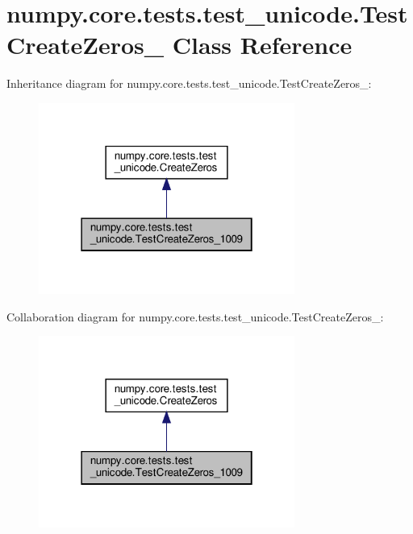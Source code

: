 \hypertarget{classnumpy_1_1core_1_1tests_1_1test__unicode_1_1TestCreateZeros__1009}{}\section{numpy.\+core.\+tests.\+test\+\_\+unicode.\+Test\+Create\+Zeros\+\_ Class Reference}
\label{classnumpy_1_1core_1_1tests_1_1test__unicode_1_1TestCreateZeros__1009}


Inheritance diagram for numpy.\+core.\+tests.\+test\+\_\+unicode.\+Test\+Create\+Zeros\+\_\+:
\nopagebreak
\begin{figure}[H]
\begin{center}
\leavevmode
\includegraphics[width=238pt]{classnumpy_1_1core_1_1tests_1_1test__unicode_1_1TestCreateZeros__1009__inherit__graph}
\end{center}
\end{figure}


Collaboration diagram for numpy.\+core.\+tests.\+test\+\_\+unicode.\+Test\+Create\+Zeros\+\_\+:
\nopagebreak
\begin{figure}[H]
\begin{center}
\leavevmode
\includegraphics[width=238pt]{classnumpy_1_1core_1_1tests_1_1test__unicode_1_1TestCreateZeros__1009__coll__graph}
\end{center}
\end{figure}
